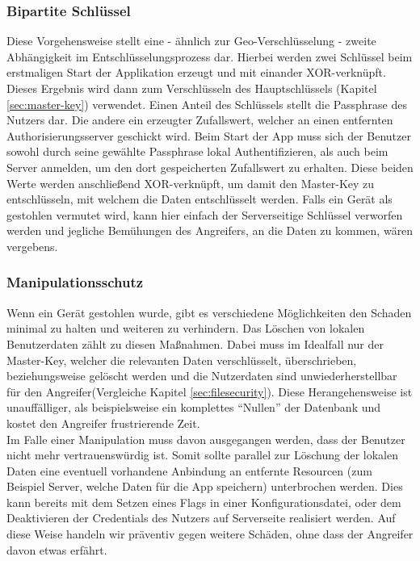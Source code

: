 		\subsubsection{Bipartite Schlüssel}
			Diese Vorgehensweise stellt eine - ähnlich zur Geo-Verschlüsselung - zweite
			Abhängigkeit im Entschlüsselungsprozess dar. Hierbei werden zwei Schlüssel
			beim erstmaligen Start der Applikation erzeugt und mit einander
			XOR-verknüpft. Dieses Ergebnis wird dann zum Verschlüsseln des
			Hauptschlüssels (Kapitel \ref{sec:master-key}) verwendet. Einen Anteil des
			Schlüssels stellt die Passphrase des Nutzers dar. Die andere ein
			erzeugter Zufallswert, welcher an einen entfernten Authorisierungsserver
			geschickt wird. Beim Start der App muss sich der Benutzer sowohl durch seine
			gewählte Passphrase lokal Authentifizieren, als auch beim Server anmelden,
			um den dort gespeicherten Zufallswert zu erhalten. Diese beiden Werte werden
			anschließend XOR-verknüpft, um damit den Master-Key zu entschlüsseln, mit
			welchem die Daten entschlüsselt werden. Falls ein Gerät als gestohlen
			vermutet wird, kann hier einfach der Serverseitige Schlüssel verworfen
			werden und jegliche Bemühungen des Angreifers, an die Daten zu kommen, wären
			vergebens.
		\subsubsection{Manipulationsschutz}
			Wenn ein Gerät gestohlen wurde, gibt es verschiedene Möglichkeiten den
			Schaden minimal zu halten und weiteren zu verhindern. Das Löschen von lokalen
			Benutzerdaten zählt zu diesen Maßnahmen. Dabei muss im Idealfall nur der
			Master-Key, welcher die relevanten Daten verschlüsselt,	überschrieben,
			beziehungsweise gelöscht werden und die Nutzerdaten sind unwiederherstellbar
			für den Angreifer(Vergleiche Kapitel \ref{sec:filesecurity}). Diese
			Herangehensweise ist unauffälliger, als beispielsweise ein komplettes
			"`Nullen"' der Datenbank und kostet den Angreifer frustrierende Zeit.\\
			Im Falle einer Manipulation muss davon ausgegangen werden, dass der Benutzer
			nicht mehr vertrauenswürdig ist. Somit sollte parallel zur Löschung der
			lokalen Daten eine eventuell vorhandene Anbindung an entfernte Resourcen
			(zum Beispiel Server, welche Daten für die App speichern) unterbrochen
			werden.	Dies kann bereits mit dem Setzen eines Flags in einer
			Konfigurationsdatei, oder dem Deaktivieren der Credentials des Nutzers auf
			Serverseite realisiert werden. Auf diese Weise handeln wir präventiv gegen
			weitere Schäden, ohne dass der Angreifer davon etwas erfährt.\\
